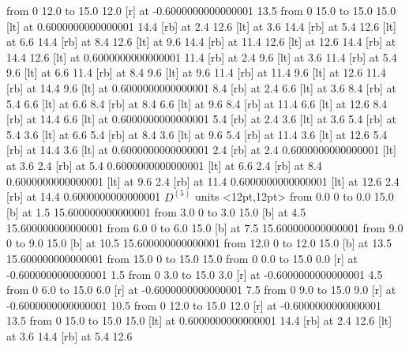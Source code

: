   \putrule from 0 12.0 to 15.0 12.0
   [r] at -0.6000000000000001 13.5
  \putrule from 0 15.0 to 15.0 15.0
 [lt] at 0.6000000000000001 14.4
 [rb] at 2.4 12.6
 [lt] at 3.6 14.4
 [rb] at 5.4 12.6
 [lt] at 6.6 14.4
 [rb] at 8.4 12.6
 [lt] at 9.6 14.4
 [rb] at 11.4 12.6
 [lt] at 12.6 14.4
 [rb] at 14.4 12.6
 [lt] at 0.6000000000000001 11.4
 [rb] at 2.4 9.6
 [lt] at 3.6 11.4
 [rb] at 5.4 9.6
 [lt] at 6.6 11.4
 [rb] at 8.4 9.6
 [lt] at 9.6 11.4
 [rb] at 11.4 9.6
 [lt] at 12.6 11.4
 [rb] at 14.4 9.6
 [lt] at 0.6000000000000001 8.4
 [rb] at 2.4 6.6
 [lt] at 3.6 8.4
 [rb] at 5.4 6.6
 [lt] at 6.6 8.4
 [rb] at 8.4 6.6
 [lt] at 9.6 8.4
 [rb] at 11.4 6.6
 [lt] at 12.6 8.4
 [rb] at 14.4 6.6
 [lt] at 0.6000000000000001 5.4
 [rb] at 2.4 3.6
 [lt] at 3.6 5.4
 [rb] at 5.4 3.6
 [lt] at 6.6 5.4
 [rb] at 8.4 3.6
 [lt] at 9.6 5.4
 [rb] at 11.4 3.6
 [lt] at 12.6 5.4
 [rb] at 14.4 3.6
 [lt] at 0.6000000000000001 2.4
 [rb] at 2.4 0.6000000000000001
 [lt] at 3.6 2.4
 [rb] at 5.4 0.6000000000000001
 [lt] at 6.6 2.4
 [rb] at 8.4 0.6000000000000001
 [lt] at 9.6 2.4
 [rb] at 11.4 0.6000000000000001
 [lt] at 12.6 2.4
 [rb] at 14.4 0.6000000000000001
\endpicture
\bigskip
\vfil\eject
$\displaystyle D^{(5)}$
\bigskip
\beginpicture
\setcoordinatesystem units <12pt,12pt>
  \putrule from 0.0 0 to 0.0  15.0 
  [b] at 1.5 15.600000000000001
  \putrule from 3.0 0 to 3.0  15.0 
  [b] at 4.5 15.600000000000001
  \putrule from 6.0 0 to 6.0  15.0 
  [b] at 7.5 15.600000000000001
  \putrule from 9.0 0 to 9.0  15.0 
  [b] at 10.5 15.600000000000001
  \putrule from 12.0 0 to 12.0  15.0 
  [b] at 13.5 15.600000000000001
  \putrule from 15.0 0 to 15.0  15.0 
  \putrule from 0 0.0 to 15.0 0.0
   [r] at -0.6000000000000001 1.5
  \putrule from 0 3.0 to 15.0 3.0
   [r] at -0.6000000000000001 4.5
  \putrule from 0 6.0 to 15.0 6.0
   [r] at -0.6000000000000001 7.5
  \putrule from 0 9.0 to 15.0 9.0
   [r] at -0.6000000000000001 10.5
  \putrule from 0 12.0 to 15.0 12.0
   [r] at -0.6000000000000001 13.5
  \putrule from 0 15.0 to 15.0 15.0
 [lt] at 0.6000000000000001 14.4
 [rb] at 2.4 12.6
 [lt] at 3.6 14.4
 [rb] at 5.4 12.6
